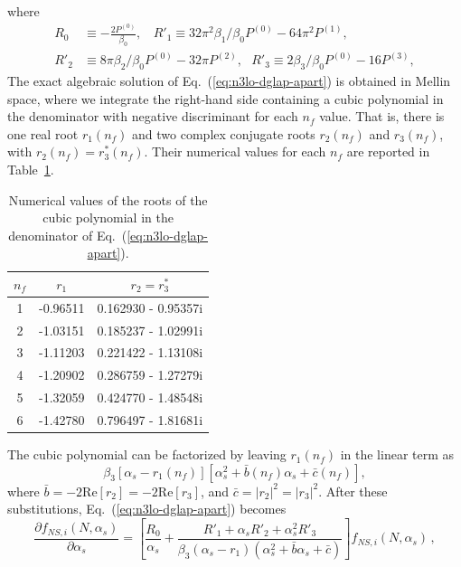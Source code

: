 \documentclass[12pt,notitlepage,aps,preprintnumbers,superscriptaddress,nofootinbib,aps,prd,floatfix]{revtex4-2}
\newcommand{\ddp}{\partial}
\begin{document}
where
%
\begin{align}
R_0 &\equiv - \frac{2 P^{(0)}}{\beta_0}, 
~~~~R'_1 \equiv 32\pi^2 \beta_1/\beta_0 P^{(0)} - 64\pi^2P^{(1)}, \\
R'_2 &\equiv 8\pi \beta_2/\beta_0 P^{(0)} - 32\pi P^{(2)}, 
~~~
R'_3 \equiv 2\beta_3/\beta_0 P^{(0)} - 16 P^{(3)},
\end{align}
%
The exact algebraic solution of Eq.~(\ref{eq:n3lo-dglap-apart}) is obtained in Mellin space, where we integrate the right-hand side containing a cubic polynomial in the denominator with negative discriminant for each $n_f$ value. That is, there is one real root $r_1(n_f)$ and two complex conjugate roots $r_2(n_f)$ and $r_3(n_f)$, with $r_2(n_f)=r^{*}_3(n_f)$. Their numerical values for each $n_f$ are reported in Table~\ref{tbl:n3lo-roots}.
%
\begin{table}[ht]
\centering
\begin{tabular}{|c|c|c|}
\hline
$n_f$ & $r_1$ & $r_2 = r_3^*$ \\ \hline
1 & -0.96511 & 0.162930 - 0.95357i \\ \hline
2 & -1.03151 & 0.185237 - 1.02991i \\ \hline
3 & -1.11203 & 0.221422 - 1.13108i \\ \hline
4 & -1.20902 & 0.286759 - 1.27279i \\ \hline
5 & -1.32059 & 0.424770 - 1.48548i \\ \hline
6 & -1.42780 & 0.796497 - 1.81681i \\ \hline
\end{tabular}
\caption{Numerical values of the roots of the cubic polynomial in the denominator of Eq.~(\ref{eq:n3lo-dglap-apart}).}
\label{tbl:n3lo-roots}
\end{table}
%
The cubic polynomial can be factorized by leaving $r_1(n_f)$ in the linear term as
%
\begin{equation}
\beta_3[\alpha_s - r_1(n_f)][\alpha_s^2 + \bar{b}(n_f) \alpha_s + \bar{c}(n_f)],
\end{equation}
%
where $\bar{b} = -2\mathrm{Re}[r_2] = -2\mathrm{Re}[r_3]$, and $\bar{c} = |r_2|^2 = |r_3|^2$. 
%
After these substitutions, Eq.~(\ref{eq:n3lo-dglap-apart}) becomes   
%
\begin{equation}
\frac{\ddp{f_{NS,i}(N,\alpha_s)}}{\ddp{\alpha_s}} = \left[ \frac{R_0}{\alpha_s} + \frac{R'_1 + \alpha_s R'_2 + \alpha_s^2 R'_3}{\beta_3(\alpha_s - r_1)(\alpha_s^2 + \bar{b}\alpha_s + \bar{c})} \right]f_{NS,i}(N,\alpha_s)\,,
\label{partial-frac}
\end{equation}
\end{document}
